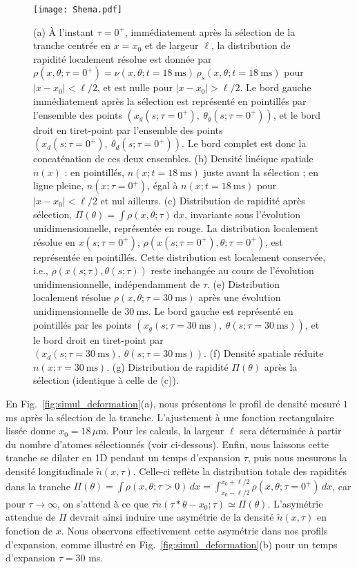 \begin{figure}[!htb]
	\centering
	\texttt{[image: Shema.pdf]}
	\caption{
(a) À l'instant $\tau = 0^+$, immédiatement après la sélection de la tranche centrée en $x = x_0$ et de largeur $\ell$, la distribution de rapidité localement résolue est donnée par $\rho(x,\theta ; \tau = 0^+) = \nu(x, \theta ; t = 18~\mathrm{ms}) \, \rho_s(x,\theta ; t = 18~\mathrm{ms})$ pour $\vert x - x_0 \vert < \ell/2$, et est nulle pour $\vert x - x_0 \vert > \ell/2$. Le bord gauche immédiatement après la sélection est représenté en pointillés par l’ensemble des points $(x_g(s; \tau = 0^+),\ \theta_g(s; \tau = 0^+))$, et le bord droit en tiret-point par l’ensemble des points $(x_d(s; \tau = 0^+),\ \theta_d(s; \tau = 0^+))$. Le bord complet est donc la concaténation de ces deux ensembles. 
(b) Densité linéique spatiale $n(x)$ : en pointillés, $n(x; t = 18~\mathrm{ms})$ juste avant la sélection ; en ligne pleine, $n(x; \tau = 0^+)$, égal à $n(x; t = 18~\mathrm{ms})$ pour $\vert x - x_0 \vert < \ell/2$ et nul ailleurs. 
(c) Distribution de rapidité après sélection, $\Pi(\theta) = \int \rho(x,\theta ; \tau)\,\mathrm{d}x$, invariante sous l’évolution unidimensionnelle, représentée en rouge. La distribution localement résolue en $x(s; \tau = 0^+)$, $\rho(x(s; \tau = 0^+), \theta ; \tau = 0^+)$, est représentée en pointillés. Cette distribution est localement conservée, i.e., $\rho(x(s; \tau), \theta(s; \tau))$ reste inchangée au cours de l’évolution unidimensionnelle, indépendamment de $\tau$. 
(e) Distribution localement résolue $\rho(x, \theta ; \tau = 30~\mathrm{ms})$ après une évolution unidimensionnelle de $30~\mathrm{ms}$. Le bord gauche est représenté en pointillés par les points $(x_g(s; \tau = 30~\mathrm{ms}),\ \theta(s; \tau = 30~\mathrm{ms}))$, et le bord droit en tiret-point par $(x_d(s; \tau = 30~\mathrm{ms}),\ \theta(s; \tau = 30~\mathrm{ms}))$. 
(f) Densité spatiale réduite $n(x; \tau = 30~\mathrm{ms})$. 
(g) Distribution de rapidité $\Pi(\theta)$ après la sélection (identique à celle de (c)).
}
	\label{fig:BiPart.coupure2}
	
\end{figure}
 
En Fig.~\ref{fig:simul_deformation}(a), nous présentons le profil de densité mesuré $1$ ms après la sélection de la tranche.  
L’ajustement à une fonction rectangulaire lissée donne $x_0 = 18\,\mu$m.  
Pour les calculs, la largeur $\ell$ sera déterminée à partir du nombre d’atomes sélectionnés (voir ci-dessous).  
Enfin, nous laissons cette tranche se dilater en 1D pendant un temps d’expansion $\tau$, puis nous mesurons la densité longitudinale $\tilde{n}(x,\tau)$.  
Celle-ci reflète la distribution totale des rapidités dans la tranche $\Pi(\theta) = \int \rho(x, \theta ; \tau > 0)\, dx = \int_{x_0 - \ell/2}^{x_0 + \ell/2} \rho(x, \theta ; \tau = 0^+)\, dx$, car pour $\tau \rightarrow \infty$, on s’attend à ce que $\tau \tilde{n}( \tau * \theta - x_0  ;\tau) \simeq \Pi(\theta)$.  
L’asymétrie attendue de $\Pi$ devrait ainsi induire une asymétrie de la densité $\tilde{n}(x,\tau)$ en fonction de $x$.  
Nous observons effectivement cette asymétrie dans nos profils d’expansion, comme illustré en Fig.~\ref{fig:simul_deformation}(b) pour un temps d’expansion $\tau=30$ ms.

